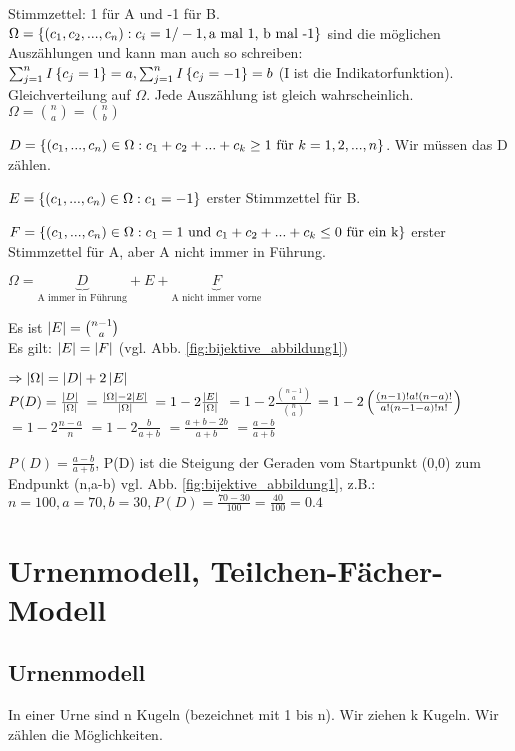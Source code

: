 Stimmzettel: 1 für A und -1 für B. $\Omega= \left\lbrace  \left( c_1,c_2,...,c_n \right) : c_i = 1/-1, \textrm{a mal 1, b mal -1} \right\rbrace  $ sind die möglichen Auszählungen und kann man auch so schreiben: $\sum_{j=1}^{n} I \left\lbrace c_j=1 \right\rbrace  = a, \sum_{j=1}^{n} I \left\lbrace c_j=-1 \right\rbrace  = b$ (I ist die Indikatorfunktion). Gleichverteilung auf $\Omega$. Jede Auszählung ist gleich wahrscheinlich. 
$\Omega = \binom n a = \binom n b $ 

$D =  \left\lbrace  \left( c_1,...,c_n \right)  \in \Omega : c_1+c_2+...+c_k \geq 1 \textrm{ für } k=1,2,...,n \right\rbrace $. Wir müssen das D zählen. 

$E =  \left\lbrace  \left( c_1,...,c_n \right)  \in \Omega : c_1=-1 \right\rbrace $ erster Stimmzettel für B.

$F =  \left\lbrace  \left( c_1,...,c_n \right)  \in \Omega : c_1=1 \textrm{ und } c_1+c_2+...+c_k \leq 0 \textrm{ für ein k} \right\rbrace $ erster Stimmzettel für A, aber A nicht immer in Führung. 

$\Omega= \underbrace{D}_{\textrm{A immer in Führung}} + E + \underbrace{F}_{\textrm{A nicht immer vorne}} $

Es ist $ \left\vert E \right\vert  = \binom{n-1}{a}$\\
Es gilt: $ \left\vert E \right\vert  =  \left\vert F \right\vert $ (vgl. Abb. \ref{fig:bijektive_abbildung1})

$\Rightarrow  \left\vert \Omega \right\vert  =  \left\vert D \right\vert  + 2  \left\vert E \right\vert $\\
$P(D)= \frac{ \left\vert D \right\vert }{ \left\vert \Omega \right\vert }$
$= \frac{ \left\vert \Omega \right\vert -2 \left\vert E \right\vert }{ \left\vert \Omega \right\vert }$
$= 1-2\frac{ \left\vert E \right\vert }{ \left\vert \Omega \right\vert }$
$= 1-2 \frac{\binom{n-1}{a}}{\binom n a}$
$= 1-2  \left( \frac{(n-1)! a! (n-a)!}{a! (n-1-a)! n!} \right) $
$= 1-2 \frac{n-a}{n}$
$= 1-2 \frac{b}{a+b}$
$= \frac{a+b-2b}{a+b}$
$= \frac{a-b}{a+b}$

$P(D)=\frac{a-b}{a+b}$, P(D) ist die Steigung der Geraden vom Startpunkt (0,0) zum Endpunkt (n,a-b) vgl. Abb. \ref{fig:bijektive_abbildung1}, z.B.: $n=100, a=70, b=30, P(D)=\frac{70-30}{100}=\frac{40}{100}=0.4$

\section{Urnenmodell, Teilchen-Fächer-Modell}

\subsection{Urnenmodell}
In einer Urne sind n Kugeln (bezeichnet mit 1 bis n). Wir ziehen k Kugeln. Wir zählen die Möglichkeiten. 

